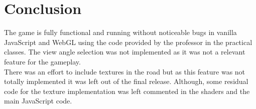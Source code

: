 \documentclass[english]{revdetua}
\begin{document}
\section{Conclusion}
The game is fully functional and running without noticeable bugs in vanilla JavaScript and WebGL using the code provided by the professor in the practical classes. The view angle selection was not implemented as it was not a relevant feature for the gameplay.
\\
There was an effort to include textures in the road but as this feature was not totally implemented it was left out of the final release. Although, some residual code for the texture implementation was left commented in the shaders and the main JavaScript code.
\end{document}
